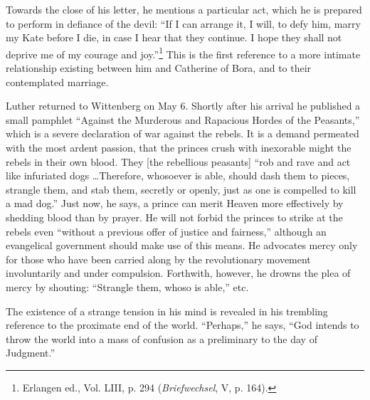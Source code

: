 Towards the close of his letter, he mentions a particular act, which he is
prepared to perform in defiance of the devil: “If I can arrange it, I will, to
defy him, marry my Kate before I die, in case I hear that they continue.
I hope they shall not deprive me of my courage and joy.”\footnote
{Erlangen ed., Vol. LIII, p. 294 (\textit{Briefwechsel}, V, p. 164).}
This is the first
reference to a more intimate relationship existing between him and Catherine
of Bora, and to their contemplated marriage.

Luther returned to Wittenberg on May 6. Shortly after his arrival
he published a small pamphlet “Against the Murderous and Rapacious
Hordes of the Peasants,” which is a severe declaration of war against
the rebels. It is a demand permeated with the most ardent passion,
that the princes crush with inexorable might the rebels in their own
blood. They [the rebellious peasants] “rob and rave and act like infuriated
dogs \dots Therefore, whosoever is able, should dash them
to pieces, strangle them, and stab them, secretly or openly, just as
one is compelled to kill a mad dog.” Just now, he says, a prince can
merit Heaven more effectively by shedding blood than by prayer.
He will not forbid the princes to strike at the rebels even “without
a previous offer of justice and fairness,” although an evangelical government
should make use of this means. He advocates mercy only for
those who have been carried along by the revolutionary movement
involuntarily and under compulsion. Forthwith, however, he drowns
the plea of mercy by shouting: “Strangle them, whoso is able,” etc.

The existence of a strange tension in his mind is revealed in his
trembling reference to the proximate end of the world. “Perhaps,”
he says, “God intends to throw the world into a mass of confusion as
a preliminary to the day of Judgment.”

